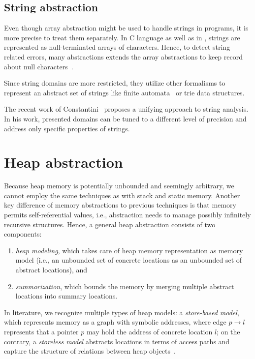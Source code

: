 \subsection{String abstraction}

Even though array abstraction might be used to handle strings in programs, it
is more precise to treat them separately. In C language as well as in \llvm,
strings are represented as null-terminated arrays of characters. Hence, to
detect string related errors, many abstractions extends the array abstractions
to keep record about null characters~\cite{Olliaro2018}.

Since string domains are more restricted, they utilize other formalisms to
represent an abstract set of strings like finite
automata~\cite{Christensen2003} or trie data structures.

The recent work of Constantini~\cite{Costantini2011, Costantini2015} proposes a
unifying approach to string analysis.  In his work, presented domains can be
tuned to a different level of precision and address only specific properties of
strings.


\section{Heap abstraction}

Because heap memory is potentially unbounded and seemingly arbitrary, we cannot
employ the same techniques as with stack and static memory. Another key
difference of memory abstractions to previous techniques is that memory permits
self-referential values, i.e., abstraction needs to manage possibly infinitely
recursive structures. Hence, a general heap abstraction consists of two
components:

\begin{enumerate}
    \item \emph{heap modeling}, which takes care of heap memory representation
        as memory model (i.e., an unbounded set of concrete locations as an
        unbounded set of abstract locations), and
    \item \emph{summarization}, which bounds the memory by merging multiple
        abstract locations into summary locations.
\end{enumerate}

\noindent
In literature, we recognize multiple types of heap models: a \emph{store-based
model}, which represents memory as a graph with symbolic addresses, where edge
$p \rightarrow l$ represents that a pointer $p$ may hold the address of
concrete location $l$; on the contrary, a \emph{storeless model} abstracts
locations in terms of access paths and capture the structure of relations
between heap objects~\cite{Kanvar2016}.

